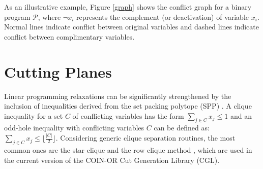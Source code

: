 \documentclass{endm}
\begin{document}
As an illustrative example, Figure \ref{graph} shows the conflict graph for a binary program $\mathcal{P}$, where $\neg x_i$ represents the complement (or deactivation) of variable $x_i$. Normal lines indicate conflict between original variables and dashed lines indicate conflict between complimentary variables.

\section{Cutting Planes}\label{cut}

Linear programming relaxations can be significantly strengthened by the inclusion of inequalities derived from the set packing polytope (SPP) \cite {Padberg1973}. A clique inequality for a set $C$ of conflicting variables has the form $\sum_{j\in C}x_{j} \leq 1$ and an odd-hole inequality with conflicting variables $C$ can be defined as: $\sum_{j\in C}x_{j} \leq \lfloor \frac{|C|}{2}\rfloor$. Considering generic clique separation routines, the most common ones are the star clique and the row clique method \cite{Borndorfer1998}, which are used in the current version of the COIN-OR\cite{LougeeHeimer2003} Cut Generation Library (CGL).  
\end{document}
